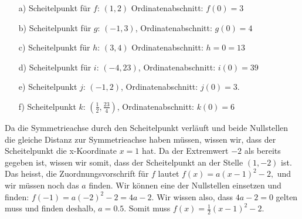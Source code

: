 \documentclass[12pt]{article}
\begin{document}
\begin{solution}
\begin{enumerate}
\item[a)] Scheitelpunkt für $f$: $(1, 2)$ Ordinatenabschnitt: $f(0)= 3$
\item[b)] Scheitelpunkt für $g$: $(-1,3)$, Ordinatenabschnitt: $g(0)= 4$
%
\item[c)] Scheitelpunkt für $h$: $(3,4)$ Ordinatenabschnitt: $h=0 = 13$
\item[d)] Scheitelpunkt für $i$: $(-4,23)$, Ordinatenabschnitt: $i(0)=39$
\item[e)] Scheitelpunkt $j$: $(-1,2)$, Ordinatenabschnitt: $j(0)=3.$ 
\item[f)] Scheitelpunkt $k$: $(\frac{1}{2},\frac{23}{4})$, Ordinatenabschnitt: $k(0) = 6$
\end{enumerate}
\end{solution}

\begin{solution}
Da die Symmetrieachse durch den Scheitelpunkt verläuft und beide Nullstellen die gleiche Distanz zur Symmetrieachse haben müssen, wissen wir, dass der Scheitelpunkt die x-Koordinate $x=1$ hat.
Da der Extremwert $-2$ als bereits gegeben ist, wissen wir somit, dass der Scheitelpunkt an der Stelle $(1,-2)$ ist.
Das heisst, die Zuordnungsvorschrift für $f$ lautet $f(x) = a(x-1)^2 -2,$ und wir müssen noch das $a$ finden.
Wir können eine der Nullstellen einsetzen und finden: $f(-1) = a(-2)^2 -2 = 4a - 2.$
Wir wissen also, dass $4a-2 = 0$ gelten muss und finden deshalb, $a=0.5$.
Somit muss $f(x)=\frac{1}{2}(x-1)^{2}-2$.
\end{solution}

\end{document}
